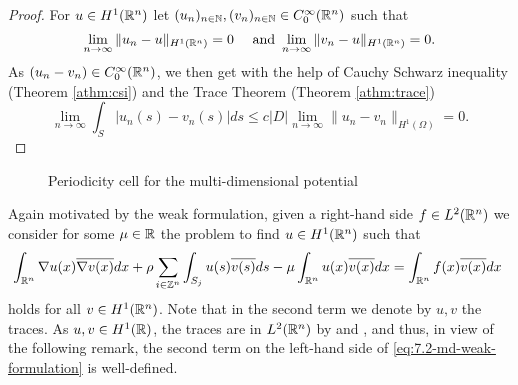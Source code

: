 \begin{proof}
	For $u \in H^{1}(\mathbb{R}^{n})$ let $(u_{n})_{n \in \mathbb{N}}, (v_{n})_{n \in \mathbb{N}} \in C_{0}^{\infty}(\mathbb{R}^{n})$ such that
	\[ \lim_{n \rightarrow \infty} \| u_{n} - u \|_{H^{1}(\mathbb{R}^{n})} = 0 \quad \text{ and } \lim_{n \rightarrow \infty} \| v_{n} - u\|_{H^{1}(\mathbb{R}^{n})} = 0.  \]
	As $(u_{n} - v_{n}) \in C_{0}^{\infty}(\mathbb{R}^{n})$, we then get with the help of Cauchy Schwarz inequality (Theorem \ref{athm:csi}) and the Trace Theorem (Theorem \ref{athm:trace})
	\[ \lim_{n \rightarrow \infty} \int_{S} \left| u_{n}(s) - v_{n}(s) \right| ds \leq c |D| \lim_{n \rightarrow \infty} \| u_{n} - v_{n} \|_{H^{1}(\Omega)} = 0. \] 
\end{proof}

\begin{figure}[!ht] \centering
	\caption{Periodicity cell for the multi-dimensional potential} \label{fig:7.1}
\end{figure}

Again motivated by the weak formulation, given a right-hand side $f \in L^{2}(\mathbb{R}^{n})$ we consider for some $\mu \in \mathbb{R}$ the problem to find $u \in H^{1}(\mathbb{R}^{n})$ such that
	\begin{equation}
		\int_{\R^{n}} \nabla u(x) \overline{\nabla v(x)} dx + \rho \sum_{i \in \Z^{n}} \int_{S_{j}} u(s) \overline{v(s)} ds - \mu \int_{\R^{n}} u(x) \overline{v(x)} dx = \int_{\R^{n}} f(x) \overline{v(x)} dx \label{eq:7.2-md-weak-formulation}
	\end{equation} 
holds for all $v \in H^{1}(\mathbb{R}^{n})$. Note that in the second term we denote by $u, v$ the traces. As $u, v \in H^{1}(\mathbb{R})$, the traces are in $L^{2}(\mathbb{R}^{n})$ by \cite[p. 251, Theorem 5.1]{evans1998partial} and \cite[p. 164]{adams2003sobolev}, and thus, in view of the following remark, the second term on the left-hand side of \eqref{eq:7.2-md-weak-formulation} is well-defined.

